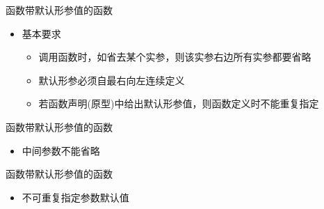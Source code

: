 \begin{frame}[fragile]{函数}{带默认形参值的函数}
  \begin{spacing}{1.8}
    \begin{itemize}
    \item \alert{基本要求}
      \begin{itemize}
        \scriptsize
      \item 调用函数时，如省去某个实参，则该实参右边所有实参都要省略
      \item 默认形参必须\alert{自最右向左连续}定义
      \item 若函数声明(原型)中给出默认形参值，则函数定义时不能重复指定
      \end{itemize}
    \end{itemize}
  \end{spacing}
  \vspace{-3ex}
  \begin{center}
    \begin{minipage}{0.9\linewidth}
    \end{minipage}
  \end{center}
\end{frame}

\begin{frame}[fragile]{函数}{带默认形参值的函数}
  \begin{itemize}
  \item \alert{中间参数不能省略}
  \end{itemize}
  \begin{center}
    \begin{minipage}{0.9\linewidth}
    \end{minipage}
  \end{center}
\end{frame}

\begin{frame}[fragile]{函数}{带默认形参值的函数}
  \begin{itemize}
  \item \alert{不可重复指定参数默认值}
  \end{itemize}
  \begin{center}
    \begin{minipage}{0.9\linewidth}
    \end{minipage}
  \end{center}
\end{frame}

